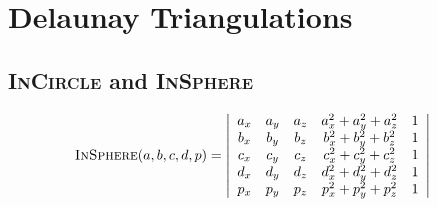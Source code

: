 \section{Delaunay Triangulations}

\subsection{\textsc{InCircle} and \textsc{InSphere}}

\begin{align*}
  \text{\textsc{InSphere}}(a, b, c, d, p) &=
  \left|
  \begin{array}{ccccc}
    a_x & a_y & a_z & a_x^2 + a_y^2 + a_z^2 & 1 \\
    b_x & b_y & b_z & b_x^2 + b_y^2 + b_z^2 & 1 \\
    c_x & c_y & c_z & c_x^2 + c_y^2 + c_z^2 & 1 \\
    d_x & d_y & d_z & d_x^2 + d_y^2 + d_z^2 & 1 \\
    p_x & p_y & p_z & p_x^2 + p_y^2 + p_z^2 & 1 \\
  \end{array}
  \right|
\end{align*}



